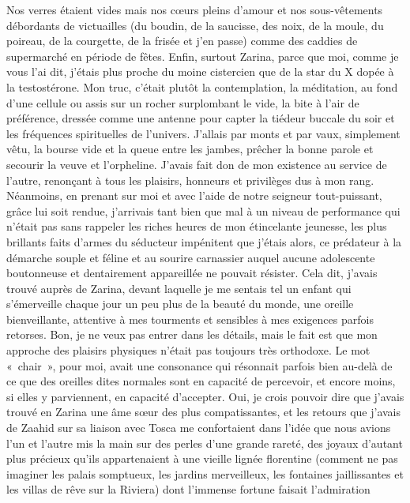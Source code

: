 %
Nos verres étaient vides mais nos cœurs pleins d’amour et nos sous-vêtements débordants de victuailles (du boudin, de la saucisse, des noix, de la moule, du poireau, de la courgette, de la frisée et j’en passe) comme des caddies de supermarché en période de fêtes. Enfin, surtout Zarina, parce que moi, comme je vous l’ai dit, j’étais plus proche du moine cistercien que de la star du X dopée à la testostérone. Mon truc, c’était plutôt la contemplation, la méditation, au fond d’une cellule ou assis sur un rocher surplombant le vide, la bite à l’air de préférence, dressée comme une antenne pour capter la tiédeur buccale du soir et les fréquences spirituelles de l’univers. J’allais par monts et par vaux, simplement vêtu, la bourse vide et la queue entre les jambes, prêcher la bonne parole et secourir la veuve et l’orpheline. J’avais fait don de mon existence au service de l’autre, renonçant à tous les plaisirs, honneurs et privilèges dus à mon rang. Néanmoins, en prenant sur moi et avec l’aide de notre seigneur tout-puissant, grâce lui soit rendue, j’arrivais tant bien que mal à un niveau de performance qui n’était pas sans rappeler les riches heures de mon étincelante jeunesse, les plus brillants faits d’armes du séducteur impénitent que j’étais alors, ce prédateur à la démarche souple et féline et au sourire carnassier auquel aucune adolescente boutonneuse et dentairement appareillée ne pouvait résister. Cela dit, j’avais trouvé auprès de Zarina, devant laquelle je me sentais tel un enfant qui s’émerveille chaque jour un peu plus de la beauté du monde, une oreille bienveillante, attentive à mes tourments et sensibles à mes exigences parfois retorses. Bon, je ne veux pas entrer dans les détails, mais le fait est que mon approche des plaisirs physiques n’était pas toujours très orthodoxe. Le mot «~chair~», pour moi, avait une consonance qui résonnait parfois bien au-delà de ce que des oreilles dites normales sont en capacité de percevoir, et encore moins, si elles y parviennent, en capacité d’accepter. Oui, je crois pouvoir dire que j’avais trouvé en Zarina une âme sœur des plus compatissantes, et les retours que j’avais de Zaahid sur sa liaison avec Tosca me confortaient dans l’idée que nous avions l’un et l’autre mis la main sur des perles d’une grande rareté, des joyaux d’autant plus précieux qu’ils appartenaient à une vieille lignée florentine (comment ne pas imaginer les palais somptueux, les jardins merveilleux, les fontaines jaillissantes et les villas de rêve sur la Riviera) dont l’immense fortune faisait l’admiration 
